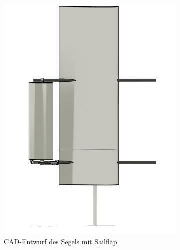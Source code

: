 \begin{figure}[H]
    \centering
    \begin{subfigure}[b]{0.43\linewidth}
        \centering
        \includegraphics[width=\linewidth]{assets/sail_cad.png}
        \caption{CAD-Entwurf des Segels mit Sailflap}
        \label{fig:sailcad}
    \end{subfigure}
    \hfill
    \begin{subfigure}[b]{0.52\linewidth}
        \centering

\end{subfigure}
\end{figure}
